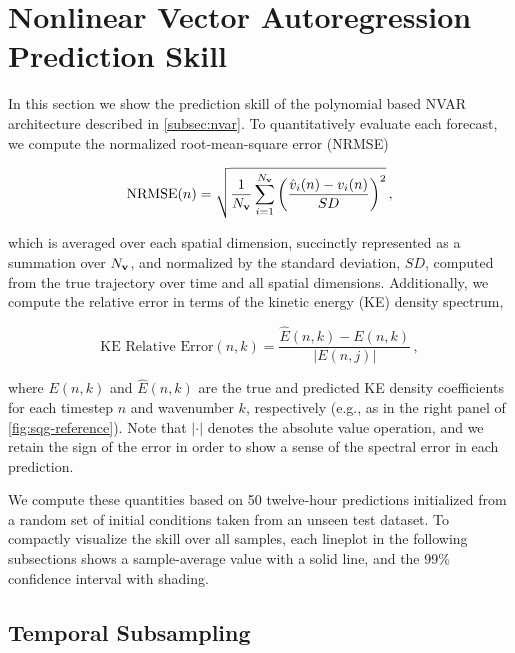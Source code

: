 \section{Nonlinear Vector Autoregression Prediction Skill}
\label{sec:nvar-results}

In this section we show the prediction skill of the polynomial based NVAR architecture
described in \cref{subsec:nvar}.
To quantitatively evaluate each forecast, we compute
the normalized root-mean-square error (NRMSE)
\begin{linenomath*}\begin{equation}
    \text{NRMSE}(n) = \sqrt{\dfrac{1}{N_{\mathbf{v}}}\sum_{i=1}^{N_{\mathbf{v}}}\left(
        \dfrac{\hat{v}_i(n) - v_i(n)}{SD}
        \right)^2 } \, ,
    \label{eq:nrmse}
\end{equation}\end{linenomath*}
which is averaged over each spatial dimension, succinctly represented as a
summation over $N_{\mathbf{v}}$, and normalized by the standard deviation, $SD$,
computed from the true trajectory over time and all spatial dimensions.
Additionally, we compute the relative error in terms of the kinetic energy
(KE) density spectrum,
\begin{linenomath*}\begin{equation}
    \text{KE Relative Error}(n, k) =
    \dfrac{\hat{E}(n, k) - E(n, k)}{|E(n,j)|} \, ,
    \label{eq:ke_relerr}
\end{equation}\end{linenomath*}
where $E(n,k)$ and $\hat{E}(n,k)$ are the true and predicted KE density coefficients
for each timestep $n$ and wavenumber $k$, respectively (e.g., as in the right
panel of \cref{fig:sqg-reference}).
Note that $|\cdot|$ denotes the absolute value operation,
and we retain the sign of the error in order to show a sense of the
spectral error in each prediction.

We compute these quantities based on 50 twelve-hour predictions initialized from a random
set of initial conditions taken from an unseen test dataset.
To compactly visualize the skill over all samples, each lineplot in the
following subsections shows a sample-average value with a solid line, and the
99\% confidence interval with shading.

\subsection{Temporal Subsampling}
\label{subsec:nvar-subsampling}


